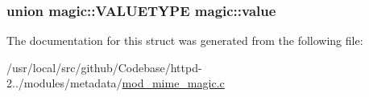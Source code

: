 \subsubsection[{\texorpdfstring{value}{value}}]{\setlength{\rightskip}{0pt plus 5cm}union {\bf magic\+::\+V\+A\+L\+U\+E\+T\+Y\+PE}  magic\+::value}\hypertarget{structmagic_a22209e0ed0303f04488686dee72c4ddf}{}\label{structmagic_a22209e0ed0303f04488686dee72c4ddf}


The documentation for this struct was generated from the following file\+:\begin{DoxyCompactItemize}
\item 
/usr/local/src/github/\+Codebase/httpd-\/2../modules/metadata/\hyperlink{mod__mime__magic_8c}{mod\+\_\+mime\+\_\+magic.\+c}\end{DoxyCompactItemize}
